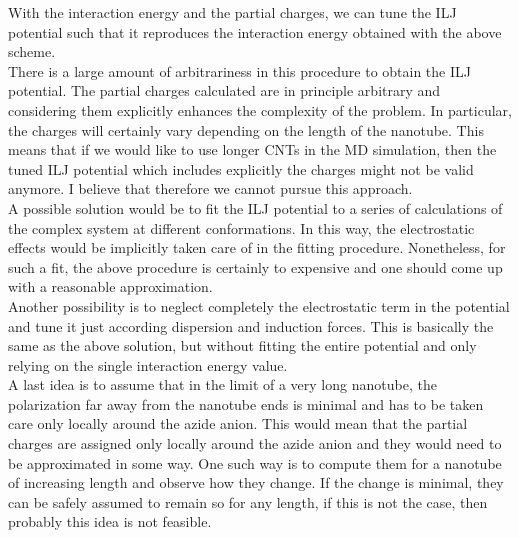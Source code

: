 \documentclass[utf8]{article}
\begin{document}
%
\medskip
With the interaction energy and the partial charges, we can tune the ILJ potential such that it reproduces the interaction energy obtained with the above scheme.\\
\newline
There is a large amount of arbitrariness in this procedure to obtain the ILJ potential.
The partial charges calculated are in principle arbitrary and considering them explicitly enhances the complexity of the problem. In particular, the charges will certainly vary depending on the length of the nanotube. This means that if we would like to use longer CNTs in the MD simulation, then the tuned ILJ potential which includes explicitly the charges might not be valid anymore.
I believe that therefore we cannot pursue this approach.\\
A possible solution would be to fit the ILJ potential to a series of calculations of the complex system at different conformations. In this way, the electrostatic effects would be implicitly taken care of in the fitting procedure. Nonetheless, for such a fit, the above procedure is certainly to expensive and one should come up with a reasonable approximation.\\
Another possibility is to neglect completely the electrostatic term in the potential and tune it just according dispersion and induction forces. This is basically the same as the above solution, but without fitting the entire potential and only relying on the single interaction energy value.\\
A last idea is to assume that in the limit of a very long nanotube, the polarization far away from the nanotube ends is minimal and has to be taken care only locally around the azide anion. This would mean that the partial charges are assigned only locally around the azide anion and they would need to be approximated in some way. One such way is to compute them for a nanotube of increasing length and observe how they change. If the change is minimal, they can be safely assumed to remain so for any length, if this is not the case, then probably this idea is not feasible.





\end{document}
